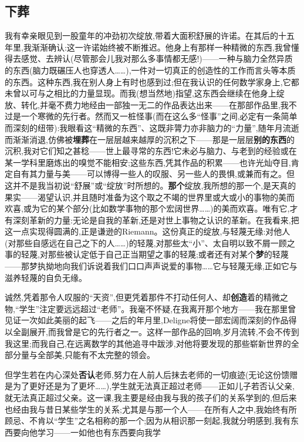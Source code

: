 \subsection{下葬}


我有幸亲眼见到一股童年的冲劲初次绽放,带着大面积舒展的许诺。在其后的十五年里,我渐渐确认:这一许诺始终被不断推迟。他身上有那样一种精微的东西,我曾懂得去感觉、去辨认(尽管那会儿我对那么多事情都无感!)——一种与脑力全然异质的东西(脑力既碾压人也穿透人……),一件对一切真正的创造性的工作而言头等本质的东西。这种东西,我在别人身上有时也感到过;但在我认识的任何数学家身上,它都未曾以可与之相比的力量显现。而我(想当然地)指望,这东西会继续在他身上绽放、转化,并毫不费力地经由一部独一无二的作品表达出来——在那部作品里,我不过是一个寒微的先行者。然而又一桩怪事(而在这么多“怪事”之间,必定有一条简单而深刻的纽带):我眼看这“精微的东西”、这既非膂力亦非脑力的“力量”,随年月流逝而渐渐消退,仿佛被\textbf{埋葬}在一层层越来越厚的沉积之下——那是一层层\textbf{别的东西}的沉积,我对它们知之甚稔——世上最寻常的东西!它未必与脑力、与老到的经验或在某一学科里磨炼出的嗅觉不能相安;这些东西,凭其作品的积累——也许光灿夺目,肯定自有其力量与美——可以博得一些人的叹服、另一些人的畏惧,或兼而有之。但这并不是我当初说“舒展”或“绽放”时所想的。\textbf{那个}绽放,我所想的那一个,是天真的果实——渴望认识,并且随时准备为这个取之不竭的世界里或大或小的事物的美而欢喜,或为它的某个部分(比如数学事物的那个宏阔世界……)的美而欢喜。唯有它,才有深刻革新的力量:无论是自我的革新,还是对世上事物之认识的革新。在我看来,把这一点实现得圆满的,正是谦逊的Riemann。这份真正的绽放,与轻蔑无缘\dmark{}:对他人(对那些自感远在自己之下的人……)的轻蔑,对那些太“小”、太自明以致不屑一顾之事的轻蔑,对那些被认定低于自己正当期望之事的轻蔑;或者还有对某个\textbf{梦}的轻蔑——那梦执拗地向我们诉说着我们口口声声说爱的事物……它与轻蔑无缘,正如它与滋养轻蔑的自负无缘。

诚然,凭着那令人叹服的“天资”,但更凭着那件不打动任何人、却\textbf{创造}着的精微之物,“学生”注定要远远超过“老师”。我毫不怀疑,在我离开那个地方——我在那里曾见证一次如此美丽的起飞——之后的年月里,Deligne将使一部宏阔而深刻的作品得以全副展开,而我曾是它的先行者之一。这样一部作品的回响,岁月流转,不会不传到我这里;而我自己,在远离数学的其他追寻中跋涉,对他将要发现的那些崭新世界的全部分量与全部美,只能有不太完整的领会。

但学生若在内心深处\textbf{否认}老师,努力在人前人后抹去老师的一切痕迹(无论这份馈赠是为了更好还是为了更坏……),学生就无法真正超过老师——正如儿子若否认父亲,就无法真正超过父亲。这一课,我主要是经由我与我的孩子们的关系学到的,但后来也经由我与昔日某些学生的关系;尤其是与那一个人——在所有人之中,我始终有所顾忌、不肯以“学生”之名相称的那一个;因为从相识那一刻起,我就分明感到,我有东西要向他学习——一如他也有东西要向我学


